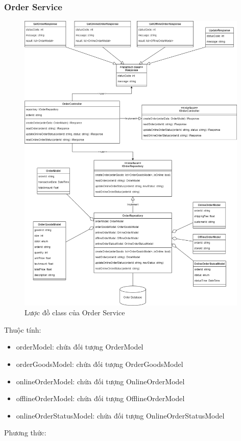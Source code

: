 \subsubsection{Order Service}
\begin{figure}[!htp]
	\centering
	\includegraphics[width=11cm]{img/Architecture/service/OrderService.png}
	\newline
	\caption{Lược đồ class của Order Service}
\end{figure}
Thuộc tính:
\begin{itemize}
	\item orderModel: chứa đối tượng OrderModel
	\item orderGoodsModel: chứa đối tượng OrderGoodsModel
	\item onlineOrderModel: chứa đối tượng OnlineOrderModel
	\item offlineOrderModel: chứa đối tượng OfflineOrderModel
	\item onlineOrderStatusModel: chứa đối tượng OnlineOrderStatusModel
\end{itemize}
Phương thức:
